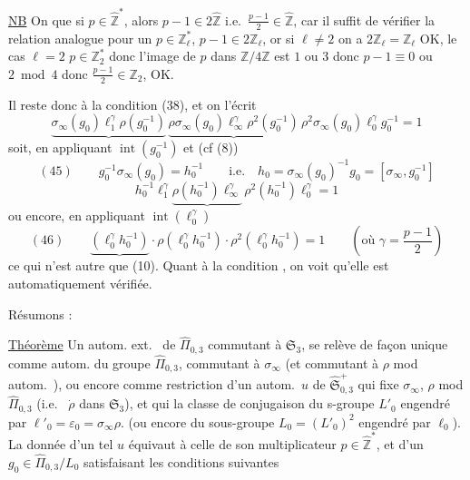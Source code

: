 \quad
\uline{NB} On  que si $p\in\widehat{\mathbb Z}^{*}$, alors
$p-1\in 2\widehat{\mathbb Z}$ i.e.\ $\frac{p-1}{2}\in\widehat{\mathbb Z}$,
car il suffit de vérifier la relation analogue pour un $p\in\mathbb Z_\ell^{*}$,
 $p-1\in 2\mathbb Z_\ell$, or si $\ell\ne2$ on a
$2\mathbb Z_\ell=\mathbb Z_\ell$ OK,  le cas $\ell=2$
$p\in\mathbb Z_2^{*}$ donc l'image de $p$ dans $\mathbb Z/4\mathbb Z$
est $1$ ou $3$ donc $p-1\equiv0$ ou $2\bmod4$
 donc $\frac{p-1}{2}\in\mathbb Z_2$, OK.

\par
Il reste donc à  la condition (38), et on l'écrit
\[
\underbrace{\sigma_\infty(g_0)\ell_1^\gamma\rho(g_0^{-1})}\,
\underbrace{\rho\sigma_\infty(g_0)\ell_\infty^\gamma\rho^2(g_0^{-1})}\,
\rho^2\sigma_\infty(g_0)\ell_0^\gamma g_0^{-1}=1
\]
soit, en appliquant $\operatorname{int}(g_0^{-1})$ et
(cf (8))
\[
(45)\qquad g_0^{-1}\sigma_\infty(g_0)=h_0^{-1}
\qquad\text{i.e.}\quad
h_0=\sigma_\infty(g_0)^{-1}g_0=[\sigma_\infty,g_0^{-1}]
\]
\[
h_0^{-1}\ell_1^\gamma\underbrace{\rho(h_0^{-1})\ell_\infty^\gamma}\,
\rho^2(h_0^{-1})\ell_0^\gamma=1
\]
ou encore, en appliquant $\operatorname{int}(\ell_0^\gamma)$
\[
(46)\qquad
\boxed{\underbrace{(\ell_0^\gamma h_0^{-1})}\cdot
\rho(\ell_0^\gamma h_0^{-1})\cdot\rho^2(\ell_0^\gamma h_0^{-1})=1}
\qquad\left(\text{où }\gamma=\frac{p-1}{2}\right)
\]
ce qui n'est autre que (10). Quant à la condition ,
on voit qu'elle est  automatiquement vérifiée.


Résumons :

\uline{Théorème} Un autom. ext.\  de
$\widehat{\Pi}_{0,3}$ commutant à
$\mathfrak S_3$, se relève de façon unique comme autom.
du groupe  $\widehat{\Pi}_{0,3}$, commutant à
$\sigma_\infty$ (et commutant à $\rho$ mod autom.\ ),
ou encore comme restriction d'un autom.\ $u$ de
$\widehat{\mathfrak S}_{0,3}^{+}$
qui fixe $\sigma_\infty$,  $\rho$ mod $\widehat{\Pi}_{0,3}$
(i.e.\  $\dot\rho$ dans $\mathfrak S_3$),
et qui  la classe de conjugaison du s-groupe
 $L'_0$
 engendré par $\ell'_0=\varepsilon_0=\sigma_\infty\rho$.
(ou encore du sous-groupe  $L_0=(L'_0)^2$ engendré par $\ell_0$).
La donnée d'un tel $u$ équivaut à celle de son multiplicateur
$p\in\widehat{\mathbb Z}^{*}$, et d'un $g_0\in\widehat{\Pi}_{0,3}/L_0$
satisfaisant les conditions suivantes

